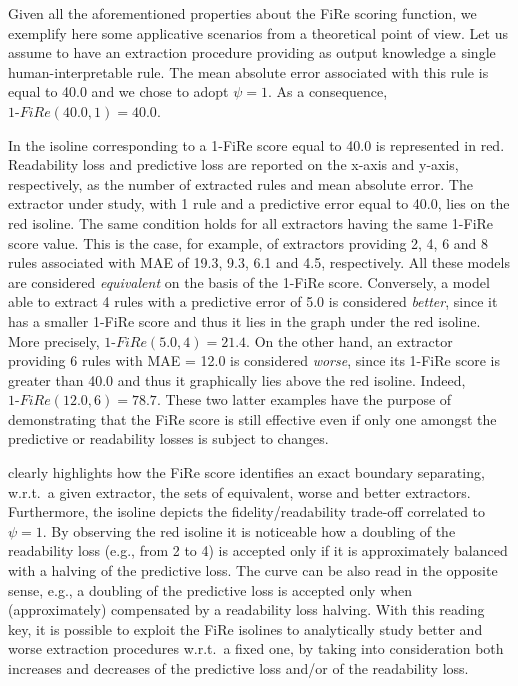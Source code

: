\documentclass{article}
\newcommand{\fire}{FiRe}
\begin{document}
Given all the aforementioned properties about the \fire{} scoring function, we exemplify here some applicative scenarios from a theoretical point of view.
%
Let us assume to have an extraction procedure providing as output knowledge a single human-interpretable rule.
%
The mean absolute error associated with this rule is equal to 40.0 and we chose to adopt $\psi=1$.
%
As a consequence, $1\textrm{-}\fire(40.0, 1)=40.0$.

In  the isoline corresponding to a 1-\fire{} score equal to 40.0 is represented in red.
%
Readability loss and predictive loss are reported on the x-axis and y-axis, respectively, as the number of extracted rules and mean absolute error.
%
The extractor under study, with 1 rule and a predictive error equal to 40.0, lies on the red isoline.
%
The same condition holds for all extractors having the same 1-\fire{} score value.
%
This is the case, for example, of extractors providing 2, 4, 6 and 8 rules associated with MAE of 19.3, 9.3, 6.1 and 4.5, respectively.
%
All these models are considered \emph{equivalent} on the basis of the 1-\fire{} score.
%
Conversely, a model able to extract 4 rules with a predictive error of 5.0 is considered \emph{better}, since it has a smaller 1-\fire{} score and thus it lies in the graph under the red isoline.
%
More precisely, $1\textrm{-}\fire(5.0, 4)=21.4$.
%
On the other hand, an extractor providing 6 rules with MAE = 12.0 is considered \emph{worse}, since its 1-\fire{} score is greater than 40.0 and thus it graphically lies above the red isoline.
%
Indeed, $1\textrm{-}\fire(12.0, 6)=78.7$.
%
These two latter examples have the purpose of demonstrating that the \fire{} score is still effective even if only one amongst the predictive or readability losses is subject to changes.

 clearly highlights how the \fire{} score identifies an exact boundary separating, w.r.t.\ a given extractor, the sets of equivalent, worse and better extractors.
%
Furthermore, the isoline depicts the fidelity/readability trade-off correlated to $\psi=1$.
%
%
By observing the red isoline it is noticeable how a doubling of the readability loss (e.g., from 2 to 4) is accepted only if it is approximately balanced with a halving of the predictive loss.
%
The curve can be also read in the opposite sense, e.g., a doubling of the predictive loss is accepted only when (approximately) compensated by a readability loss halving.
%
With this reading key, it is possible to exploit the \fire{} isolines to analytically study better and worse extraction procedures w.r.t.\ a fixed one, by taking into consideration both increases and decreases of the predictive loss and/or of the readability loss.
\end{document}
